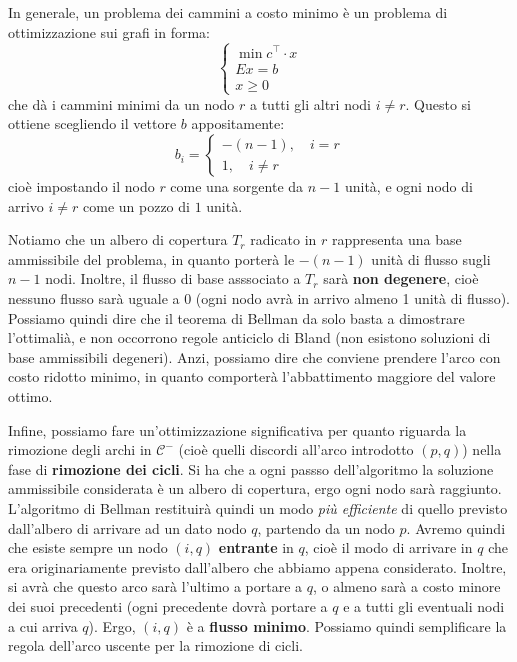 \documentclass[a4paper,11pt]{article}
\begin{document}
In generale, un problema dei cammini a costo minimo è un problema di ottimizzazione sui grafi in forma:
\[
	\begin{cases}
		\min c^\intercal \cdot x \\
		Ex = b \\ 
		x \geq 0
	\end{cases}
\]
che dà i cammini minimi da un nodo $r$ a tutti gli altri nodi $i \neq r$.
Questo si ottiene scegliendo il vettore $b$ appositamente:
\[
	b_i =
	\begin{cases}
		-(n - 1), \quad i = r \\ 
		1, \quad i \neq r
	\end{cases}
\]
cioè impostando il nodo $r$ come una sorgente da $n-1$ unità, e ogni nodo di arrivo $i \neq r$ come un pozzo di $1$ unità.

Notiamo che un albero di copertura $T_r$ radicato in $r$ rappresenta una base ammissibile del problema, in quanto porterà le $-(n-1)$ unità di flusso sugli $n-1$ nodi.
Inoltre, il flusso di base asssociato a $T_r$ sarà \textbf{non degenere}, cioè nessuno flusso sarà uguale a 0 (ogni nodo avrà in arrivo almeno 1 unità di flusso).
Possiamo quindi dire che il teorema di Bellman da solo basta a dimostrare l'ottimalià, e non occorrono regole anticiclo di Bland (non esistono soluzioni di base ammissibili degeneri).
Anzi, possiamo dire che conviene prendere l'arco con costo ridotto minimo, in quanto comporterà l'abbattimento maggiore del valore ottimo.

Infine, possiamo fare un'ottimizzazione significativa per quanto riguarda la rimozione degli archi in $\mathcal{C}^-$ (cioè quelli discordi all'arco introdotto $(p,q)$) nella fase di \textbf{rimozione dei cicli}.
Si ha che a ogni passso dell'algoritmo la soluzione ammissibile considerata è un albero di copertura, ergo ogni nodo sarà raggiunto.
L'algoritmo di Bellman restituirà quindi un modo \textit{più efficiente} di quello previsto dall'albero di arrivare ad un dato nodo $q$, partendo da un nodo $p$.
Avremo quindi che esiste sempre un nodo $(i,q)$ \textbf{entrante} in $q$, cioè il modo di arrivare in $q$ che era originariamente previsto dall'albero che abbiamo appena considerato.
Inoltre, si avrà che questo arco sarà l'ultimo a portare a $q$, o almeno sarà a costo minore dei suoi precedenti (ogni precedente dovrà portare a $q$ e a tutti gli eventuali nodi a cui arriva $q$).
Ergo, $(i, q)$ è a \textbf{flusso minimo}.
Possiamo quindi semplificare la regola dell'arco uscente per la rimozione di cicli.
\end{document}
